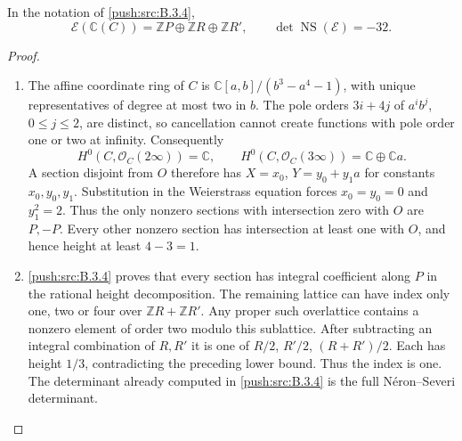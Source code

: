 \begin{corollary}\hypertarget{tag-0309}{}\label{push:src:B.3.5}\label{push:B35}

In the notation of \ref{push:src:B.3.4},
\[
 \mathscr E(\mathbb C(C))
   =\mathbb ZP\oplus\mathbb ZR\oplus\mathbb ZR',
 \qquad \det\operatorname{NS}(\mathscr E)=-32.
\]
\end{corollary}


\begin{proof}
\begin{enumerate}[label=\arabic*.,leftmargin=*]
\item The affine coordinate ring of $C$ is
$\mathbb C[a,b]/(b^3-a^4-1)$, with
unique representatives of degree at most
two in $b$. The pole orders $3i+4j$ of
$a^ib^j$, $0\le j\le2$, are distinct,
so cancellation cannot create functions
with pole order one or two at infinity.
Consequently
\[
 H^0(C,\mathcal O_C(2\infty))=\mathbb C,
 \qquad
 H^0(C,\mathcal O_C(3\infty))
       =\mathbb C\oplus\mathbb Ca.
\]
A section disjoint from $O$ therefore
has $X=x_0$, $Y=y_0+y_1a$ for constants
$x_0,y_0,y_1$. Substitution in the
Weierstrass equation forces $x_0=y_0=0$
and $y_1^2=2$. Thus the only nonzero
sections with intersection zero with
$O$ are $P,-P$.
Every other nonzero section has
intersection at least one with $O$,
and hence height at least $4-3=1$.

\item \ref{push:src:B.3.4} proves that every section has
integral coefficient along $P$ in the
rational height decomposition. The
remaining lattice can have index only
one, two or four over $\mathbb ZR+\mathbb ZR'$.
Any proper such overlattice contains a
nonzero element of order two modulo
this sublattice. After subtracting an
integral combination of $R,R'$ it is
one of $R/2$, $R'/2$, $(R+R')/2$.
Each has height $1/3$, contradicting
the preceding lower bound. Thus the
index is one. The determinant already
computed in \ref{push:src:B.3.4} is the full
N\'eron--Severi determinant.

\end{enumerate}
\end{proof}
